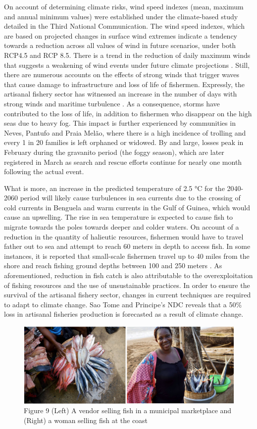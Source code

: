 \documentclass[
]{book}
\begin{document}
On account of determining climate risks, wind speed indexes (mean, maximum and annual minimum values) were established under the climate-based study detailed in the Third National Communication. The wind speed indexes, which are based on projected changes in surface wind extremes indicate a tendency towards a reduction across all values of wind in future scenarios, under both RCP4.5 and RCP 8.5. There is a trend in the reduction of daily maximum winds that suggests a weakening of wind events under future climate projections . Still, there are numerous accounts on the effects of strong winds that trigger waves that cause damage to infrastructure and loss of life of fishermen. Expressly, the artisanal fishery sector has witnessed an increase in the number of days with strong winds and maritime turbulence . As a consequence, storms have contributed to the loss of life, in addition to fishermen who disappear on the high seas due to heavy fog. This impact is further experienced by communities in Neves, Pantufo and Praia Melão, where there is a high incidence of trolling and every 1 in 20 families is left orphaned or widowed. By and large, losses peak in February during the gravanito period (the foggy season), which are later registered in March as search and rescue efforts continue for nearly one month following the actual event.

What is more, an increase in the predicted temperature of 2.5 °C for the 2040-2060 period will likely cause turbulences in sea currents due to the crossing of cold currents in Benguela and warm currents in the Gulf of Guinea, which would cause an upwelling. The rise in sea temperature is expected to cause fish to migrate towards the poles towards deeper and colder waters. On account of a reduction in the quantity of halieutic resources, fishermen would have to travel father out to sea and attempt to reach 60 meters in depth to access fish. In some instances, it is reported that small-scale fishermen travel up to 40 miles from the shore and reach fishing ground depths between 100 and 250 meters . As aforementioned, reduction in fish catch is also attributable to the overexploitation of fishing resources and the use of unsustainable practices. In order to ensure the survival of the artisanal fishery sector, changes in current techniques are required to adapt to climate change. Sao Tome and Principe's NDC reveals that a 50\% loss in artisanal fisheries production is forecasted as a result of climate change.

\begin{figure}
\centering
\includegraphics{images/fish_vending.png}
\caption{Figure 9 (Left) A vendor selling fish in a municipal marketplace and (Right) a woman selling fish at the coast}
\end{figure}
\end{document}
